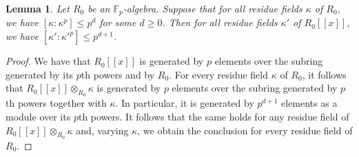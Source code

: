 \documentclass{amsart}
\newtheorem{lemma}[theorem]{Lemma}
\theoremstyle{definition}
\begin{document}
\begin{lemma} 
\label{powerserieslem}
Let $R_0$ be an $\mathbb{F}_p$-algebra. 
Suppose that 
for all residue fields $\kappa$ of $R_0$, we have $[\kappa: \kappa^p] \leq p^d $
for some $d \geq 0$. 
Then for all residue fields $\kappa'$ of $R_0[[x]]$, we have $[\kappa':
\kappa'^p] \leq p^{d+1}$. 
\end{lemma} 
\begin{proof} 
We have that $R_0[[x]]$ is generated by $p$ elements over the subring generated
by its $p$th powers and by $R_0$. For every residue field $\kappa$ of $R_0$, 
it follows that $R_0[[x]] \otimes_{R_0} \kappa$ is generated by $p$ elements
over the subring generated by $p$th powers together with $\kappa$. 
In particular, it is generated by $p^{d+1}$ elements as a module over its $p$th
powers. 
It follows that the same holds for any residue field of $R_0[[x]] \otimes_{R_0}
\kappa$ and, varying $\kappa$, we obtain the conclusion for every residue field
of $R_0$. 
\end{proof} 
\end{document}
